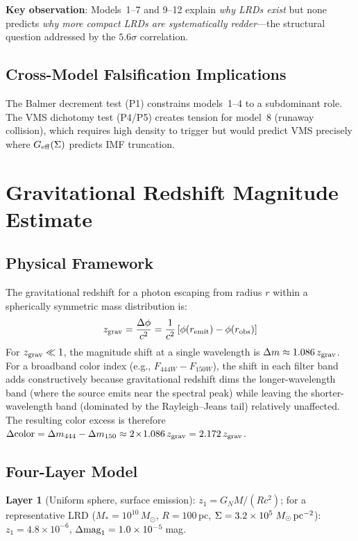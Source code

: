 \documentclass[apj,twocolumn,longbibliography,linenumbers]{aastex701}
\begin{document}
\textbf{Key observation}: Models~1--7 and 9--12 explain \textit{why LRDs exist} but none predicts \textit{why more compact LRDs are systematically redder}---the structural question addressed by the $5.6\sigma$ correlation.

\subsection{Cross-Model Falsification Implications}

The Balmer decrement test (P1) constrains models~1--4 to a subdominant role. The VMS dichotomy test (P4/P5) creates tension for model~8 (runaway collision), which requires high density to trigger but would predict VMS precisely where $G_{\rm eff}(\Sigma)$ predicts IMF truncation.

\section{Gravitational Redshift Magnitude Estimate}

\subsection{Physical Framework}

The gravitational redshift for a photon escaping from radius $r$ within a spherically symmetric mass distribution is:
\begin{equation}
z_{\rm grav} = \frac{\Delta\phi}{c^2} = \frac{1}{c^2}\left[\phi(r_{\rm emit}) - \phi(r_{\rm obs})\right]
\end{equation}
For $z_{\rm grav} \ll 1$, the magnitude shift at a single wavelength is $\Delta m \approx 1.086\,z_{\rm grav}$. For a broadband color index (e.g., $F_{444W} - F_{150W}$), the shift in each filter band adds constructively because gravitational redshift dims the longer-wavelength band (where the source emits near the spectral peak) while leaving the shorter-wavelength band (dominated by the Rayleigh--Jeans tail) relatively unaffected. The resulting color excess is therefore $\Delta{\rm color} = \Delta m_{444} - \Delta m_{150} \approx 2\!\times\!1.086\,z_{\rm grav} = 2.172\,z_{\rm grav}$.

\subsection{Four-Layer Model}

\textbf{Layer 1} (Uniform sphere, surface emission): $z_1 = G_N M/(R c^2)$; for a representative LRD ($M_* = 10^{10}\,M_\odot$, $R = 100$\,pc, $\Sigma = 3.2 \times 10^5\;M_\odot\,{\rm pc}^{-2}$): $z_1 = 4.8 \times 10^{-6}$, $\Delta{\rm mag}_1 = 1.0 \times 10^{-5}$\,mag.
\end{document}
